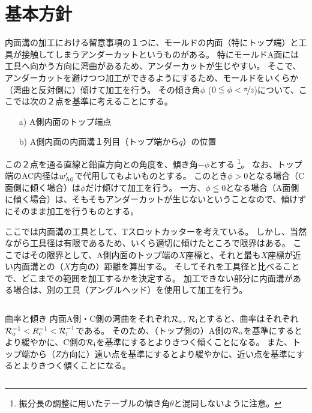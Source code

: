 \section{基本方針}
内面溝の加工における留意事項の１つに、モールドの内面（特にトップ端）と工具が接触してしまうアンダーカットというものがある。
特にモールドA面には工具へ向かう方向に湾曲があるため、アンダーカットが生じやすい。
そこで、アンダーカットを避けつつ加工ができるようにするため、モールドをいくらか（湾曲と反対側に）傾けて加工を行う。
その傾き角$\phi$ ($0 \leqq \phi < \nicefrac\pi2$)について、ここでは次の２点を基準に考えることにする。
\begin{tcolorbox}[title=A面の内面溝, fonttitle=\gtfamily\bfseries]
\begin{enumerate}
\item[a)]
A側内面のトップ端点
\item[b)]
A側内面の内面溝１列目（トップ端から$q$）の位置
\end{enumerate}
\end{tcolorbox}\noindent
この２点を通る直線と鉛直方向との角度を、傾き角$-\phi$とする
\footnote{振分長の調整に用いたテーブルの傾き角$\theta$と混同しないように注意。}。
なお、トップ端のAC内径は$w'_{\text A0}$で代用してもよいものとする。
このとき$\phi > 0$となる場合（C面側に傾く場合）は$\phi$だけ傾けて加工を行う。
一方、$\phi \leqq 0$となる場合（A面側に傾く場合）は、そもそもアンダーカットが生じないということなので、傾けずにそのまま加工を行うものとする。
\begin{hosokubox}
ここでは内面溝の工具として、Tスロットカッターを考えている。
しかし、当然ながら工具径は有限であるため、いくら適切に傾けたところで限界はある。
ここではその限界として、A側内面のトップ端の$X$座標と、それと最も$X$座標が近い内面溝との（$X$方向の）距離を算出する。
そしてそれを工具径と比べることで、どこまでの範囲を加工するかを決定する。
加工できない部分に内面溝がある場合は、別の工具（アングルヘッド）を使用して加工を行う。
\end{hosokubox}
\begin{Column}{曲率と傾き}
内面A側・C側の湾曲をそれぞれ$\mathcal R_\text o$, $\mathcal R_\text i$とすると、曲率はそれぞれ$\mathcal R_\text o^{-1} < R_\text c^{-1} < \mathcal R_\text i^{-1}$である。
そのため、（トップ側の）A側の$\mathcal R_\text o$を基準にするとより緩やかに、C側の$\mathcal R_\text i$を基準にするとよりきつく傾くことになる。
また、トップ端から（$Z$方向に）遠い点を基準にするとより緩やかに、近い点を基準にするとよりきつく傾くことになる。
\end{Column}

